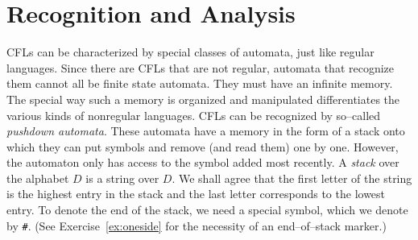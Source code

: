 \section{Recognition and Analysis}
%
%
%
CFLs can be characterized by special classes of automata, just 
like regular languages. Since there are CFLs that are not regular,
automata that recognize them cannot all be finite state
automata. They must have an infinite memory. The special way
such a memory is organized and manipulated differentiates
the various kinds of nonregular languages. CFLs
can be recognized by so--called {\it pushdown
automata}. These automata have a memory in the form of
a stack onto which they can put symbols and remove (and
read them) one by one. However, the automaton only has
access to the symbol added most recently. A {\it stack\/}
over the alphabet $D$ is a string over $D$. We shall agree
that the first letter of the string is the highest entry
in the stack and the last letter corresponds to the lowest
entry. To denote the end of the stack, we need a special
symbol, which we denote by {\tt \#}. (See Exercise~\ref{ex:oneside} 
for the necessity of an end--of--stack marker.)

